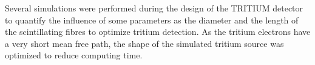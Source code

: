Several simulations were performed during the design of the TRITIUM detector to quantify the influence of some parameters as the diameter and the length of the scintillating fibres to optimize tritium detection. As the tritium electrons have a very short mean free path, the shape of the simulated tritium source was optimized to reduce computing time. 